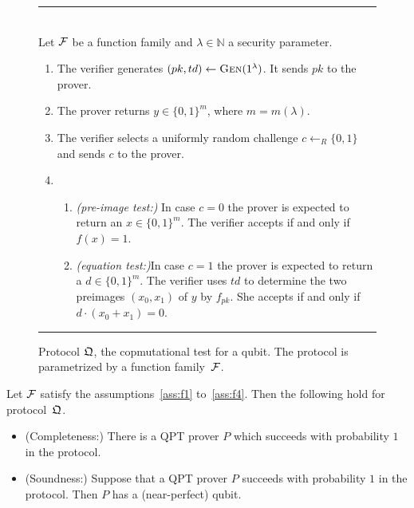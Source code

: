 \begin{figure}[htbp]
\rule[1ex]{16.5cm}{0.5pt}\\
Let $\mathcal{F}$ be a function family and $\lambda\in\mathbb{N}$ a security parameter. \begin{enumerate}
\item The verifier generates $(pk,td)\leftarrow \textsc{Gen}(1^\lambda)$. It sends $pk$ to the prover. 
\item The prover returns $y \in \{0,1\}^m$, where $m=m(\lambda)$. 
\item The verifier selects a uniformly random challenge $c\leftarrow_R \{0,1\}$ and sends $c$ to the prover. 
\item 
\begin{enumerate}
\item \emph{(pre-image test:)} In case $c=0$ the prover is expected to return an $x\in\{0,1\}^m$. The verifier accepts if and only if $f(x)=1$. 
\item \emph{(equation test:)}In case $c=1$ the prover is expected to return a $d\in \{0,1\}^m$. The verifier uses $td$ to determine the two preimages $(x_0,x_1)$ of $y$ by $f_{pk}$. She accepts if and only if $d\cdot(x_0+ x_1)=0$. 
\end{enumerate}
\end{enumerate}
\rule[1ex]{16.5cm}{0.5pt}
\caption{Protocol $\mathfrak{Q}$, the copmutational test for a qubit. The protocol is parametrized by a function family~$\mathcal{F}$.}
\label{fig:protocol-comp-test}
\end{figure}



\begin{theorem}\label{thm:comp-qubit}
Let $\mathcal{F}$ satisfy the assumptions~\ref{ass:f1} to~\ref{ass:f4}. Then the following hold for protocol~$\mathfrak{Q}$.
\begin{itemize}
\item (Completeness:) There is a QPT prover $P$ which succeeds with probability $1$ in the protocol.
\item (Soundness:) Suppose that a QPT prover $P$ succeeds with probability $1$ in the protocol. Then $P$ has a (near-perfect) qubit. 
\end{itemize}
\end{theorem}

